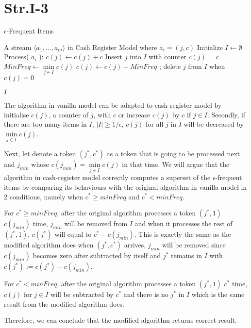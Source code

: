 
\section*{Str.I-3}

\begin{algorithm}[h]
  \caption{ $\epsilon$-Frequent Items}
  \label{alg:frequent-items}
  \begin{algorithmic}
      \Require A stream $\langle a_1, \dotsc, a_m \rangle $ in Cash Register Model where $a_i = (j,c)$
      \State Initialize $I \gets \emptyset$
      \State Process( $a_i $ ):
      	\State $c(j) \gets c(j) + c$
      \Else
      \State Insert $j$ into $I$ with counter $c(j)$ = c
		\State $MinFreq \gets   \min\limits_{  j \in I}  c(j)$
			\State $c(j) \gets c(j) - MinFreq$ ; delete $j$ from $I$ when $c(j)=0$
		\EndFor
	\EndIf
     \EndIf
     
  \Return $I$
\end{algorithmic}
\end{algorithm}

The algorithm in vanilla model can be adapted to cash-register model by initialise $c(j)$, a counter of $j$, with $c$ or increase $c(j)$ by $c$ if $j \in I$. Secondly, if there are too many items in $I$, $ |I| \ge 1/\epsilon$, $c(j)$ for all $j$ in $I$ will be decreased by  $\min\limits_{  j \in I}  c(j)$.

Next, let denote a token $( j^*, c^* )$ as a token that is going to be processed next and $j_{min}$ whose $c(j_{min})  = \min\limits_{  j \in I}  c(j)$ in that time.  We will argue that the algorithm in cash-register model correctly computes a superset of the $\epsilon$-frequent items by comparing its behaviours with the original algorithm in vanilla model in 2 conditions, namely when $c^* \ge minFreq$ and $c^* < minFreq$.

For $c^* \ge minFreq$, after the original algorithm processes a token $(j^*, 1)$ $c(j_{min})$ time, $j_{min}$ will be removed from $I$ and when it processes the rest of $(j^*, 1)$, $c(j^*)$ will equal to $c^* - c(j_{min})$. This is exactly the same as the modified algorithm does when $(j^*, c^*)$ arrives, $j_{min}$ will be removed since $c(j_{min})$ becomes zero after subtracted by itself and $j^*$ remains in $I$ with $c(j^*) := c(j^*) - c(j_{min})$.

For $c^* < minFreq$, after the original algorithm processes a token $(j^*, 1)$  $c^*$ time,  $c(j)$ for  $j \in I$ will be subtracted by $c^*$ and there is no $j^*$ in $I$ which is the same result from the modified algorithm does.

Therefore, we can conclude that the modified algorithm returns correct result.
